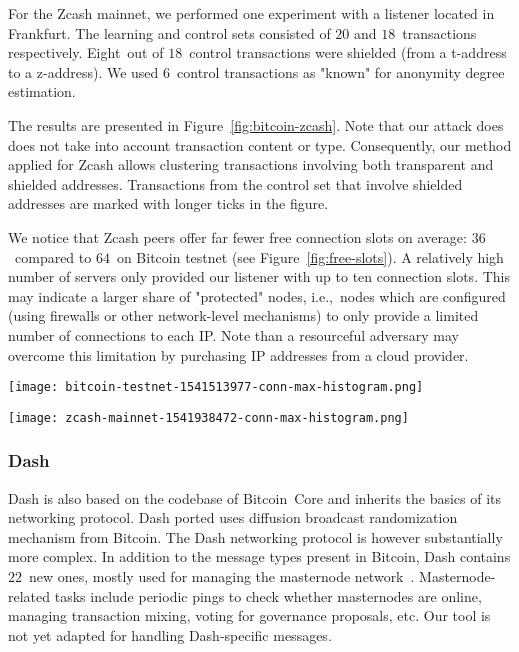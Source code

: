 For the Zcash mainnet, we performed one experiment with a listener located in Frankfurt.
The learning and control sets consisted of $20$ and $18$~transactions respectively.
Eight~out of $18$~control transactions were shielded (from a t-address to a z-address).
We used $6$~control transactions as "known" for anonymity degree estimation.

The results are presented in Figure~\ref{fig:bitcoin-zcash}.
Note that our attack does does not take into account transaction content or type.
Consequently, our method applied for Zcash allows clustering transactions involving both transparent and shielded addresses.
Transactions from the control set that involve shielded addresses are marked with longer ticks in the figure.

We notice that Zcash peers offer far fewer free connection slots on average: $36$~compared to $64$~on Bitcoin testnet (see Figure~\ref{fig:free-slots}).
A relatively high number of servers only provided our listener with up to ten connection slots.
This may indicate a larger share of "protected" nodes, i.e.,~nodes which are configured (using firewalls or other network-level mechanisms) to only provide a limited number of connections to each IP\@.
Note than a resourceful adversary may overcome this limitation by purchasing IP addresses from a cloud provider.

\begin{figure*}
	\centering
	\begin{minipage}{0.5\textwidth}
		\centering
		\texttt{[image: bitcoin-testnet-1541513977-conn-max-histogram.png]}
		\caption{Free slots: Bitcoin testnet}
	\end{minipage}\hfill
	\begin{minipage}{0.5\textwidth}
		\centering
		\texttt{[image: zcash-mainnet-1541938472-conn-max-histogram.png]}
		\caption{Free slots: Zcash mainnet}
	\end{minipage}\hfill
	\label{fig:free-slots}
\end{figure*}


\subsubsection{Dash}

Dash is also based on the codebase of Bitcoin~Core and inherits the basics of its networking protocol.
Dash ported uses diffusion broadcast randomization mechanism from Bitcoin.
The Dash networking protocol is however substantially more complex.
In addition to the message types present in Bitcoin, Dash contains $22$~new ones, mostly used for managing the masternode network~\cite{Schinzel2015}.
Masternode-related tasks include periodic pings to check whether masternodes are online, managing transaction mixing, voting for governance proposals, etc.
Our tool is not yet adapted for handling Dash-specific messages.

